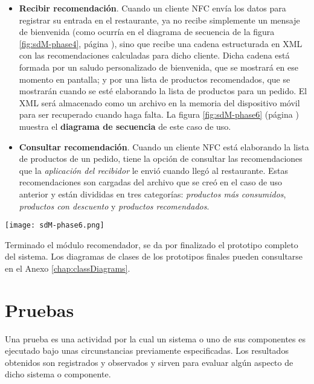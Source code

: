 \begin{itemize}

\item \textbf{Recibir recomendación}. Cuando un cliente \acs{NFC} envía los
datos para registrar su entrada en el restaurante, ya no recibe simplemente
un mensaje de bienvenida (como ocurría en el diagrama de secuencia de la
figura \ref{fig:sdM-phase4}, página \pageref{fig:sdM-phase4}), sino que
recibe una cadena estructurada en \acs{XML} con las recomendaciones calculadas
para dicho cliente. Dicha cadena está formada por un saludo personalizado
de bienvenida, que se mostrará en ese momento en pantalla; y por una lista
de productos recomendados, que se mostrarán cuando se esté elaborando la lista 
de productos para un pedido. El \acs{XML} será almacenado como un archivo en la 
memoria del dispositivo móvil para ser recuperado cuando haga falta.
La figura \ref{fig:sdM-phase6} (página \pageref{fig:sdM-phase6}) muestra el 
\textbf{diagrama de secuencia} de este caso de uso.

\item \textbf{Consultar recomendación}. Cuando un cliente \acs{NFC} está
elaborando la lista de productos de un pedido, tiene la opción de consultar
las recomendaciones que la \emph{aplicación del recibidor} le envió cuando
llegó al restaurante. Estas recomendaciones son cargadas del archivo que se
creó en el caso de uso anterior y están divididas en tres categorías:
\emph{productos más consumidos}, \emph{productos con descuento} y
\emph{productos recomendados}.
\end{itemize}

  \begin{sidewaysfigure}[hp]
    \begin{center}
      \texttt{[image: sdM-phase6.png]}
      \caption{Diagrama de secuencia del caso de uso \emph{recibir 
      recomendación}.}
      \label{fig:sdM-phase6}
    \end{center}
  \end{sidewaysfigure}

Terminado el módulo recomendador, se da por finalizado el prototipo completo
del sistema. Los diagramas de clases de los prototipos finales pueden
consultarse en el Anexo \ref{chap:classDiagrams}.

\section{Pruebas}
\label{sec:testing}
Una prueba es una actividad por la cual un sistema o uno de sus componentes
es ejecutado bajo unas circunstancias previamente especificadas. Los resultados
obtenidos son registrados y observados y sirven para evaluar algún aspecto
de dicho sistema o componente.

